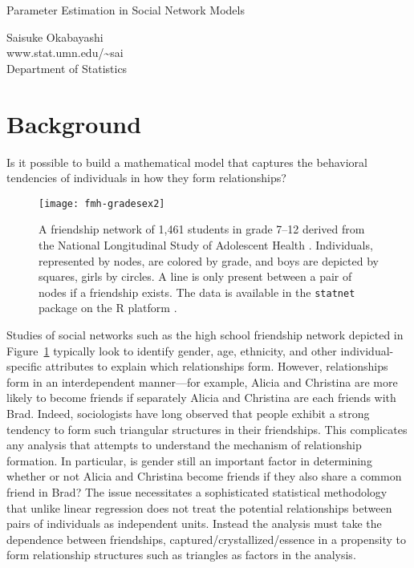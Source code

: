 \documentclass[12pt]{article}
\begin{document}
\begin{center}
{\normalsize{Parameter Estimation in Social Network Models}} 

\vspace{0.15in}
{Saisuke Okabayashi} \\
www.stat.umn.edu/\textasciitilde sai\\
{Department of Statistics}\\
\end{center}


\section{Background}
Is it possible to build a mathematical model that captures the behavioral tendencies of individuals in how they form relationships?

\begin{figure}[h!]
\centering
\texttt{[image: fmh-gradesex2]}
\caption{A friendship network of 1,461 students in grade 7--12 derived 
from the National Longitudinal Study of Adolescent Health \citep{Resnick:1997}.  
Individuals, represented by nodes, are colored by grade, and boys
are depicted by squares, girls by circles.  A line is only present between a pair of 
nodes if a friendship exists.  The data is available in the 
\texttt{statnet} package \citep{statnet:R} on the R platform \citep{R}.}
\label{F:fmh}
\end{figure}

Studies of social networks such as the high school friendship network depicted 
in Figure~\ref{F:fmh} typically look to identify gender, age, ethnicity, and 
other individual-specific attributes to explain which relationships form.  
However, relationships form in an interdependent manner---for example, Alicia 
and Christina are more likely to become friends if separately Alicia and Christina 
are each friends with Brad. Indeed, sociologists have long observed that people 
exhibit a strong tendency to form such triangular structures in their friendships.
This complicates any analysis that attempts to understand the mechanism of 
relationship formation.   
In particular, is gender still an important factor in determining whether or not 
Alicia and Christina become friends if they also share a common friend in Brad? 
The issue necessitates a sophisticated statistical methodology that unlike linear regression 
does not treat the potential relationships between pairs of 
individuals as independent units.  Instead the analysis must take 
the dependence between friendships, captured/crystallized/essence in a propensity to
form relationship structures such as triangles as factors in the analysis.
\end{document}
